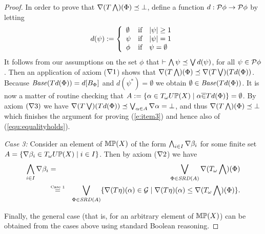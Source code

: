 \documentclass{book}
\begin{document}
\begin{proof}
In order to prove that $\nabla(T \bigwedge)(\Phi) \preceq \bot$, define a function
$d: \mathcal{P} \phi \to  \mathcal{P} \phi$ by letting 
\[	 d(\psi)  \mathrel{:=}  \left\{ 
	    \begin{array}{lcl}
	    		\emptyset & \mbox{if} & |\psi| \geq 1 \\ 
			\psi & \mbox{if} & |\psi| = 1 \\
			\phi & \mbox{if} & \psi = \emptyset
		\end{array} \right.
\]
It follows from our assumptions on the set $\phi$ that $\vdash \bigwedge\psi \preceq
\bigvee d(\psi)$, for all $\psi \in \mathcal{P}\phi$.
Then an application of axiom ($\nabla 1$) shows that 
$\nabla (T \bigwedge)(\Phi) \preceq \nabla (T \bigvee)(T d (\Phi))$.
Because $\mathit{Base}(T d(\Phi)) = d[B_\Phi]$ and 
$d(\psi^*) = \emptyset$ we obtain $\emptyset \in \mathit{Base}(T d(\Phi))$.
It is now a matter of routine checking that
$A \mathrel{:=} \{ \alpha \in T_{\omega} U \mathbb{P}(X) \mid \alpha \overline{\in} 
T d(\Phi)\} = \emptyset$. By axiom $(\nabla 3)$ we have
$\nabla (T \bigvee)(T d (\Phi)) \preceq \bigvee_{\alpha \in A} 
\nabla \alpha = \bot$, and thus $\nabla (T \bigwedge)(\Phi) \preceq \bot$
which finishes the argument for proving (\ref{e:item3}) and hence
also of (\ref{equ:equalityholds}).

\medskip

{\em Case 3:} Consider an element of $\mathbb{M} \mathbb{P}(X)$ of the form
$\bigwedge_{i \in I} \nabla \beta_i$ for some finite set $A=
\{ \nabla \beta_i \in
T_{\omega} U \mathbb{P}(X) \mid i\in I\}$. Then by axiom ($\nabla 2$)
we have
\begin{eqnarray*}
 	 \bigwedge_{i \in I} \nabla \beta_i & = & \bigvee_{\Phi \in \mathit{SRD}(A)}
	\nabla (T_{\omega} \bigwedge)(\Phi)\\
	& \stackrel{\mbox{\tiny Case 1}}{=} & \bigvee_{\Phi \in \mathit{SRD}(A)} \{ \nabla (T \eta)(\alpha) \in \mathcal{G} \mid  
	\nabla (T \eta)(\alpha) \leq \nabla (T_{\omega} \bigwedge)(\Phi)\}.
\end{eqnarray*}

Finally, the general case (that is, for an arbitrary element of $\mathbb{M} 
\mathbb{P} (X)$)
can be obtained 
%
%
from the cases above using standard Boolean reasoning.
\end{proof}	
\end{document}
